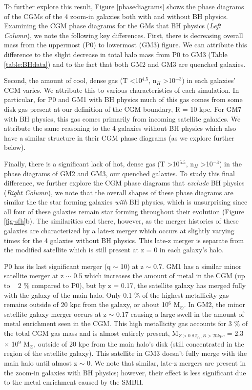 \documentclass[]{emulateapj}
\begin{document}
To further explore this result, Figure \ref{phasediagrams} shows the phase diagrams of the CGMs of the 4 zoom-in galaxies both with and without BH physics. Examining the CGM phase diagrams for the GMs that  BH physics (\textit{Left Column}), we note the following key differences. First, there is decreasing overall mass from the uppermost (P0) to lowermost (GM3) figure. We can attribute this difference to the slight decrease in total halo mass from P0 to GM3 (Table \ref{table:BHdata}) and to the fact that both GM2 and GM3 are quenched galaxies. 

Second, the amount of cool, dense gas (T \textless 10$^{4.5}$, n$_H$ \textgreater 10$^{-3}$) in each galaxies' CGM varies. We attribute this to various characteristics of each simulation. In particular, for P0 and GM1 with BH physics much of this gas comes from some disk gas present at our definition of the CGM boundary, R = 10 kpc. For GM7 with BH physics, this gas comes primarily from incoming satellite galaxies. We attribute the same reasoning to the 4 galaxies without BH physics which also have a similar structure in their CGM phase diagrams (as we explore further below).

Finally, there is a significant lack of hot, dense gas (T \textgreater 10$^{5.5}$, n$_H$ \textgreater 10$^{-3}$) in the phase diagrams of GM2 and GM3, our quenched galaxies. To study this final difference, we further explore the CGM phase diagrams that \textit{exclude} BH physics (\textit{Right Column}), we note that the overall shapes of these phase diagrams are similar the the star forming galaxies \textit{with} BH physics, which is unsurprising since all four of these galaxies remain star forming throughout their evolution (Figure \ref{fig-sfh}b). The similarities end there, however, as the merger histories of these galaxies are characterized by a late-z merger which occurs at slightly varying times for the 4 galaxies without BH physics. This late-z merger is separate from the modified satellite which is still present at z = 0 in each galaxy's halo.

P0 has its last significant merger (q $\sim$ 10) at z $\sim$ 0.7. GM1 has a similar minor satellite merger at z $\sim$ 0.5  which increases the amount of metal in the CGM (up to ~ 2 $\%$ compared to P0), but by z = 0.17, the satellite galaxy has merged fully with the galaxy of the main halo. Only 0.1 $\%$ of the highest metallicity gas remains outside of 20 kpc from the galaxy, or about 10$^6$ M$_{\odot}$.  In GM2, the minor satellite galaxy merger occurs at z $\sim$ 0.17 causing a large swell in the amount of metal enrichment seen in the CGM. This high metallicity gas accounts for 3 $\%$ of the total CGM gas mass and is almost entirely present, M$_{Z > 0.8 Z_{\odot}, R > 20 kpc}$ = 2.3 $\times$ 10$^{9}$ M$_{\odot}$, outside of 20 kpc from the main halo's disk (still concentrated in the region of the satellite galaxy). This satellite in GM3 doesn't fully merge with the main halo until almost z $\sim$ 0. We note that similar, late-z mergers are present in the zoom-in galaxies with BH physics; however, their effect is less significant due to the metal enrichment caused by the SMBH.
\end{document}
